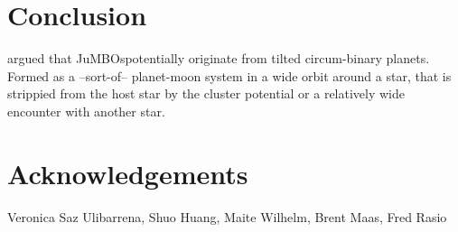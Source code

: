 \documentclass[aa]{lib/aa}
\newcommand{\jumbos}{\mbox{JuMBOs}}
\begin{document}
\section{Conclusion}

\cite{2023arXiv231015603C} argued that \jumbos potentially originate
from tilted circum-binary planets. Formed as a --sort-of-- planet-moon
system in a wide orbit around a star, that is strippied from the host
star by the cluster potential or a relatively wide encounter with
another star. 


\section*{Acknowledgements}

Veronica Saz Ulibarrena, Shuo Huang, Maite Wilhelm, Brent Maas,
Fred Rasio
    

    
\end{document}
